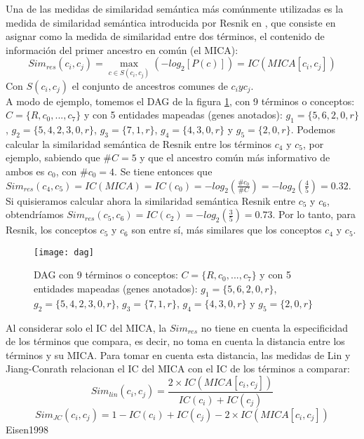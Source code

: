 Una de las medidas de similaridad semántica más comúnmente utilizadas es la medida de similaridad semántica introducida por Resnik en \cite{Resnik1995}, que consiste en asignar como la medida de similaridad entre dos términos, el contenido de información del primer ancestro en común (el MICA):
\begin{equation}
	Sim_{res}(c_i, c_j) = \max\limits_{c \in S(c_i, c_j)}(-log_2[P(c)]) = IC(MICA[c_i, c_j])
\end{equation}
Con $S(c_i, c_j)$ el conjunto de ancestros comunes de $c_i y c_j$.\\
A modo de ejemplo, tomemos el DAG de la figura \ref{fig:dag}, con 9 términos o conceptos: $C=\{R, c_0,...,c_7\}$ y con 5 entidades mapeadas (genes anotados): $g_1=\{5, 6, 2, 0, r\}$, $g_2=\{5, 4, 2, 3, 0, r\}$, $g_3=\{7, 1, r\}$, $g_4=\{4, 3, 0, r\}$ y $g_5=\{2, 0, r\}$. Podemos calcular la similaridad semántica de Resnik entre los términos $c_4$ y $c_5$, por ejemplo, sabiendo que $\#C = 5$ y que el ancestro común más informativo de ambos es $c_0$, con $\#c_0=4$. Se tiene entonces que $Sim_{res}(c_4, c_5) = IC(MICA) = IC(c_0) = -log_2(\frac{\#c_0}{\#C}) = -log_2(\frac{4}{5}) = 0.32$. Si quisieramos calcular ahora la similaridad semántica Resnik entre $c_5$ y $c_6$, obtendríamos $Sim_{res}(c_5, c_6) = IC(c_2) = -log_2(\frac{3}{5}) = 0.73$. Por lo tanto, para Resnik, los conceptos $c_5$ y $c_6$ son entre sí, más similares que los conceptos $c_4$ y $c_5$.\\
\begin{figure}[h]
    \centering
    \texttt{[image: dag]}
    \caption{DAG con 9 términos o conceptos: $C=\{R, c_0,...,c_7\}$ y con 5 entidades mapeadas (genes anotados): $g_1=\{5, 6, 2, 0, r\}$, $g_2=\{5, 4, 2, 3, 0, r\}$, $g_3=\{7, 1, r\}$, $g_4=\{4, 3, 0, r\}$ y $g_5=\{2, 0, r\}$}
    \label{fig:dag}
\end{figure}
Al considerar solo el IC del MICA, la $Sim_{res}$ no tiene en cuenta la especificidad de los términos que compara, es decir, no toma en cuenta la distancia entre los términos y su MICA. Para tomar en cuenta esta distancia, las medidas de Lin \cite{Lin1998} y Jiang-Conrath \cite{Jiang1997} relacionan el IC del MICA con el IC de los términos a comparar:
\begin{equation}
	Sim_{lin}(c_i, c_j) = \frac{2\times IC(MICA[c_i, c_j])}{IC(c_i)+IC(c_j)}
\end{equation}
\begin{equation}
	Sim_{JC}(c_i, c_j) = 1-IC(c_i)+IC(c_j)-2\times IC(MICA[c_i, c_j])
\end{equation}Eisen1998
